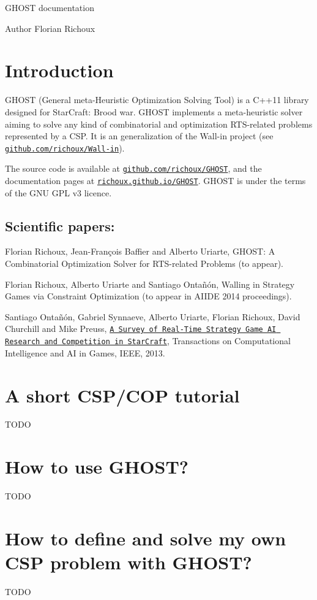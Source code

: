 G\-H\-O\-S\-T documentation \begin{DoxyAuthor}{Author}
Florian Richoux
\end{DoxyAuthor}
\section*{Introduction }

G\-H\-O\-S\-T (General meta-\/\-Heuristic Optimization Solving Tool) is a C++11 library designed for Star\-Craft\-: Brood war. G\-H\-O\-S\-T implements a meta-\/heuristic solver aiming to solve any kind of combinatorial and optimization R\-T\-S-\/related problems represented by a C\-S\-P. It is an generalization of the Wall-\/in project (see \href{https://github.com/richoux/Wall-in}{\tt github.\-com/richoux/\-Wall-\/in}).

The source code is available at \href{https://github.com/richoux/GHOST}{\tt github.\-com/richoux/\-G\-H\-O\-S\-T}, and the documentation pages at \href{http://richoux.github.io/GHOST}{\tt richoux.\-github.\-io/\-G\-H\-O\-S\-T}. G\-H\-O\-S\-T is under the terms of the G\-N\-U G\-P\-L v3 licence.

\subsection*{Scientific papers\-: }


\begin{DoxyItemize}
\item Florian Richoux, Jean-\/\-François Baffier and Alberto Uriarte, G\-H\-O\-S\-T\-: A Combinatorial Optimization Solver for R\-T\-S-\/related Problems (to appear).
\item Florian Richoux, Alberto Uriarte and Santiago Ontañón, Walling in Strategy Games via Constraint Optimization (to appear in A\-I\-I\-D\-E 2014 proceedings).
\item Santiago Ontañón, Gabriel Synnaeve, Alberto Uriarte, Florian Richoux, David Churchill and Mike Preuss, \href{http://pagesperso.lina.univ-nantes.fr/~richoux-f/publications/tciaig13.pdf}{\tt A Survey of Real-\/\-Time Strategy Game A\-I Research and Competition in Star\-Craft}, Transactions on Computational Intelligence and A\-I in Games, I\-E\-E\-E, 2013.
\end{DoxyItemize}

\section*{A short C\-S\-P/\-C\-O\-P tutorial }

T\-O\-D\-O

\section*{How to use G\-H\-O\-S\-T? }

T\-O\-D\-O

\section*{How to define and solve my own C\-S\-P problem with G\-H\-O\-S\-T? }

T\-O\-D\-O 